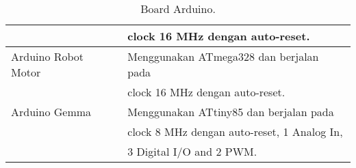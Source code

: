 \begin{table}[!ht]
\begin{tabular}{ |l|l| }
& clock 16 MHz dengan auto-reset. \\
\hline
Arduino Robot Motor & Menggunakan ATmega328 dan berjalan pada \\
& clock 16 MHz dengan auto-reset. \\
\hline
Arduino Gemma & Menggunakan ATtiny85 dan berjalan pada \\
& clock 8 MHz dengan auto-reset, 1 Analog In,\\
& 3 Digital I/O and 2 PWM. \\
\hline
\end{tabular}
\caption{Board Arduino.}
\label{table:boardarduino}
\end{table}